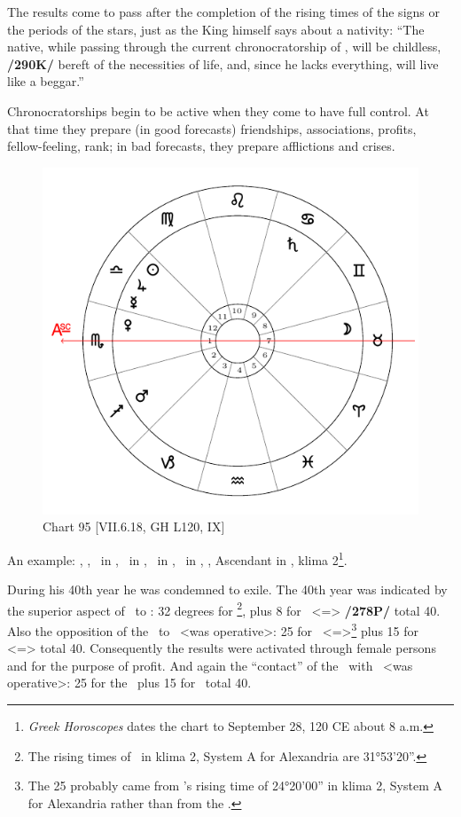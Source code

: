  
The \mndl results come to pass after the completion of the rising times of the signs or the periods of the stars, just as the King himself says about a nativity: “The native, while passing through the current
chronocratorship of \Venus, will be childless, \textbf{/290K/} bereft of the necessities of life, and, since he lacks everything, will live like a beggar.” 

Chronocratorships begin to be active when they come to have full
control. At that time they prepare (in good forecasts) friendships, associations, profits, fellow-feeling, rank; in bad forecasts, they prepare afflictions and crises.

\begin{figure}
\centering
\vspace{-1em}
\includegraphics[width=.68\textwidth]{charts/7_6_18}
\caption{Chart 95 [VII.6.18, GH L120, IX] }
\label{fig:chart95}
\end{figure} 

An example: \Sun, \Jupiter, \Mercury\, in \Libra, \Moon\, in \Taurus, \Saturn\, in \Cancer, \Mars\, in \Sagittarius,
\Venus, Ascendant in \Scorpio, klima 2\footnote{\textit{Greek Horoscopes} dates the chart to September 28, 120 CE about 8 a.m.}.

During his 40th year he was condemned to exile. The 40th year
was indicated by the superior aspect of \Saturn\, to \Libra: 32 degrees for \Cancer\footnote{The rising times of \Cancer\, in klima 2, System A for Alexandria are 31°53'20''.}, plus 8 for \Libra\, <=\Venus> \textbf{/278P/} total 40. Also the opposition of the \Moon\, to \Venus\, <was operative>: 25 for \Taurus\, <=\Moon>\footnote{The 25 probably came from \Taurus's rising time of 24°20'00'' in klima 2, System A for Alexandria rather than from the \Moon.} plus 15 for \Scorpio\, <=\Mars> total 40. Consequently the results were activated through female persons and
for the purpose of profit. And again the “contact” of the \Moon\, with \Mars\, <was operative>: 25 for the \Moon\, plus 15 for \Mars\, total 40.

